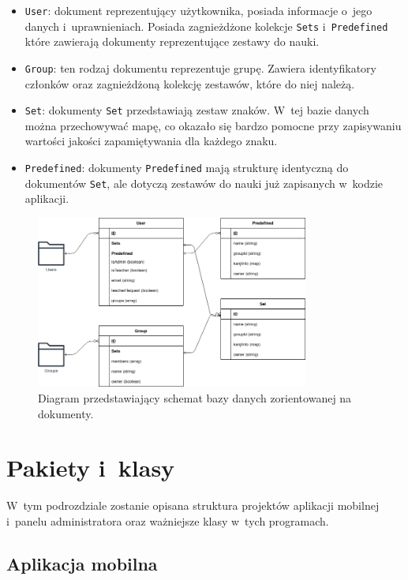 \documentclass[a4paper,twoside,12pt]{book}
\begin{document}
\begin{itemize}
\item \texttt{User}: dokument reprezentujący użytkownika, posiada informacje o~jego danych i~uprawnieniach. Posiada zagnieżdżone kolekcje \texttt{Sets} i~\texttt{Predefined} które zawierają dokumenty reprezentujące zestawy do nauki.
\item \texttt{Group}: ten rodzaj dokumentu reprezentuje grupę. Zawiera identyfikatory członków oraz zagnieżdżoną kolekcję zestawów, które do niej należą.
\item \texttt{Set}: dokumenty \texttt{Set} przedstawiają zestaw znaków. W~tej bazie danych można przechowywać mapę, co okazało się bardzo pomocne przy zapisywaniu wartości jakości zapamiętywania dla każdego znaku.
\item \texttt{Predefined}: dokumenty \texttt{Predefined} mają strukturę identyczną do dokumentów \texttt{Set}, ale dotyczą zestawów do nauki już zapisanych w~kodzie aplikacji.
\end{itemize}

\begin{figure}[]
\centering
\includegraphics[width=0.8\textwidth]{firestore.drawio}
\caption{Diagram przedstawiający schemat bazy danych zorientowanej na dokumenty.}
\label{fig:firestore}
\end{figure}

\section{Pakiety i~klasy}

W~tym podrozdziale zostanie opisana struktura projektów aplikacji mobilnej i~panelu administratora oraz ważniejsze klasy w~tych programach.

\subsection{Aplikacja mobilna}
\end{document}
